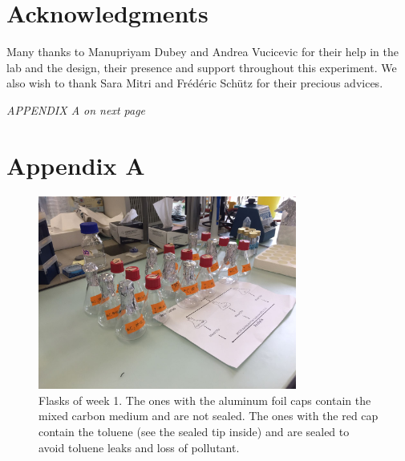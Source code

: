\documentclass[a4paper, 10pt, conference]{ieeeconf}   %
\begin{document}










\section*{Acknowledgments}
Many thanks to Manupriyam Dubey and Andrea Vucicevic for their help in the lab and the design, their presence and support throughout this experiment. We also wish to thank Sara Mitri and Frédéric Schütz for their precious advices. 



\printbibliography
\vspace*{\fill}
\textit{APPENDIX A on next page}
\clearpage
\section*{Appendix A}

\begin{figure}[H]
	\includegraphics[width=8.5cm]{flasks.jpg}
	\caption{Flasks of week 1. The ones with the aluminum foil caps contain the mixed carbon medium and are not sealed. The ones with the red cap contain the toluene (see the sealed tip inside) and are sealed to avoid toluene leaks and loss of pollutant.}
	\label{flasks}
\end{figure}
\end{document}
